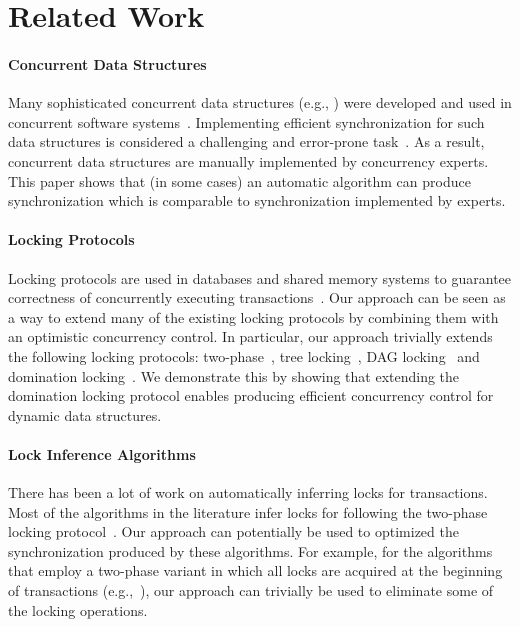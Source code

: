 \section{Related Work}\label{sec:related}
\paragraph{Concurrent Data Structures}
Many sophisticated concurrent data structures (e.g., \cite{ArbelA2014,DrachslerVY2014,NatarajanM2014,BrownER2014,CrainGR2013,BraginskyP2012,
AfekKKMT2012,EllenFRB2010,BronsonCCO2010,HerlihyLLS2007,Michael:1996}) 
were developed and used in concurrent software systems~\cite{Ohad:OOPSLA11}.
Implementing efficient synchronization for such data structures is considered a challenging and error-prone task~\cite{Ohad:OOPSLA11,Doh:SPAA04,Jin:2012}.
As a result, concurrent data structures are manually implemented by concurrency experts.
This paper shows that (in some cases) an automatic algorithm can produce synchronization which is comparable to synchronization implemented by experts.

\paragraph{Locking Protocols}
Locking protocols are used in databases and shared memory systems to guarantee correctness
of concurrently executing transactions~\cite{Weikum:2001,BHG:Book87}. 
Our approach can be seen as a way to extend many of the existing locking protocols by combining them with an optimistic concurrency control. 
In particular, our approach trivially extends the following locking protocols:  
two-phase~\cite{Eswaran:1976}, tree locking~\cite{SilberschatzK1980}, DAG locking~\cite{CH:PODS95} and domination locking~\cite{Gueta2011}.
We demonstrate this by showing that extending the  domination locking protocol enables producing efficient concurrency control for
dynamic data structures.


\paragraph{Lock Inference Algorithms}
There has been a lot of work on automatically inferring locks for transactions.
Most of the algorithms in the literature infer locks for following the two-phase
locking protocol~\cite{MZGB:POPL06,Emmi06POPL,gudka2012lock,CCG:PLDI08,HFP:TRANSACT06,CGE:CC08}.
Our approach can potentially be used to optimized the synchronization produced by these algorithms.
For example, for the algorithms that employ a two-phase variant in which all locks are acquired at the beginning of transactions (e.g.,~\cite{gudka2012lock,CCG:PLDI08}),
our approach can trivially be used to eliminate some of the locking operations.


